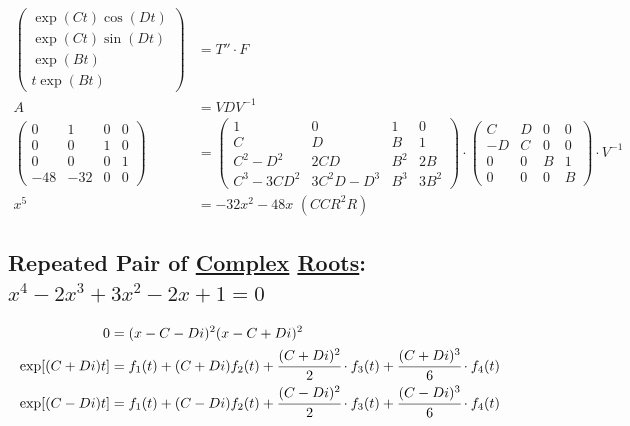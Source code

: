 \documentclass[12pt,a4paper]{article}
\begin{document}
\begin{align}
\begin{pmatrix} \exp (Ct) \cos (Dt) \\ \exp (Ct) \sin (Dt) \\ \exp (Bt)  \\ t \exp (Bt) \end{pmatrix} &= T'' \cdot F  \\
A &= VDV^{-1} \\
\left( \begin{matrix} 0 & 1 & 0 & 0 \\ 0 & 0 & 1 & 0 \\ 0 & 0 & 0 & 1 \\ -48 & -32 & 0 & 0 \end{matrix} \right)
&=
\left( \begin{matrix}  1 & 0 & 1 & 0 \\ C & D & B & 1 \\ C^2-D^2 & 2CD & B^2 & 2B \\ C^3-3CD^2 & 3C^2D - D^3 & B^3 & 3B^2  \end{matrix} \right) \cdot
\left( \begin{matrix}  C & D & 0 & 0 \\ -D & C & 0 & 0 \\ 0 & 0 & B & 1 \\ 0 & 0 & 0 & B  \end{matrix} \right) \cdot V^{-1} \\
x^5 &= - 32x^2 - 48 x\,\,(CCR^2R)
\end{align}

\subsection{Repeated Pair of \href{}{Complex} \href{}{Roots}: $x^4 - 2 x^3 + 3 x^2 - 2 x + 1 = 0$}

\begin{align}
0 &= (x - C - Di)^2(x - C + Di)^2 \\
\exp [(C + Di)t] &= f_1(t) + (C + Di) f_2(t) + \cfrac{(C + Di)^2}{2}\cdot f_3(t) + \cfrac{(C + Di)^3}{6}\cdot f_4(t) \\
\exp [(C - Di)t] &= f_1(t) + (C - Di) f_2(t) + \cfrac{(C - Di)^2}{2}\cdot f_3(t) + \cfrac{(C - Di)^3}{6}\cdot f_4(t)
\end{align}
\end{document}
